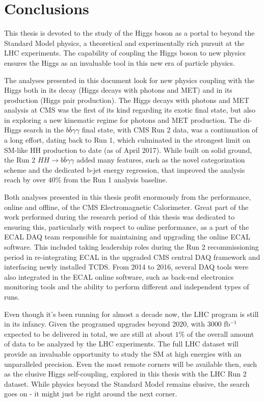 \chapter{Conclusions}

This thesis is devoted to the study of the Higgs boson as a portal to beyond the Standard Model physics, a theoretical and experimentally rich pursuit at the LHC experiments.  
The capability of coupling the Higgs boson to new physics ensures the Higgs as an invaluable tool in this new era of particle physics.

The analyses presented in this document look for new physics coupling with the Higgs both in its decay (Higgs decays with photons and MET) and in its production (Higgs pair production).
The Higgs decays with photons and MET analysis at CMS was the first of its kind regarding its exotic final state, but also in exploring a new kinematic regime for photons and MET production. 
The di-Higgs search in the $b\bar{b}\gamma\gamma$ final state, with CMS Run 2 data, was a continuation of a long effort, dating back to Run 1, which culminated in the strongest limit on SM-like HH production to date (as of April 2017). 
While built on solid ground, the Run 2 $HH\rightarrow b\bar{b}\gamma\gamma$ added many features, such as the novel categorization scheme and the dedicated b-jet energy regression, that improved the analysis reach by over $40\%$ from the Run 1 analysis baseline.

Both analyses presented in this thesis profit enormously from the performance, online and offline, of the CMS Electromagnetic Calorimeter. 
Great part of the work performed during the research period of this thesis was dedicated to ensuring this, particularly with respect to online performance, as a part of the ECAL DAQ team responsible for maintaining and upgrading the online ECAL software. 
This included taking leadership roles during the Run 2 recommissioning period in re-integrating ECAL in the upgraded CMS central DAQ framework and interfacing newly installed TCDS. 
From 2014 to 2016, several DAQ tools were also integrated in the ECAL online software, such as back-end electronics monitoring tools and the ability to perform different and independent types of runs. 

Even though it's been running for almost a decade now, the LHC program is still in its infancy. 
Given the programed upgrades beyond 2020, with 3000 fb$^{-1}$ expected to be delivered in total, we are still at about $1\%$ of the overall amount of data to be analyzed by the LHC experiments. 
The full LHC dataset will provide an invaluable opportunity to study the SM at high energies with an unparalleled  precision. 
Even the most remote corners will be available then, such as the elusive Higgs self-coupling, explored in this thesis with the LHC Run 2 dataset. 
While physics beyond the Standard Model remains elusive, the search goes on - it might just be right around the next corner.

 